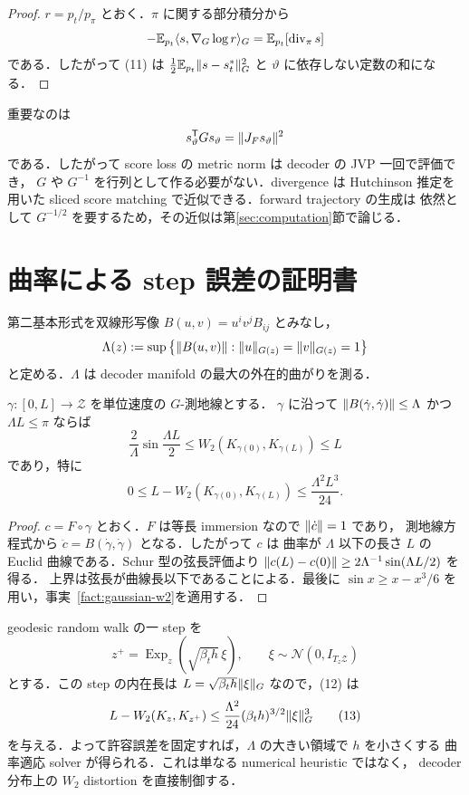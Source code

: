 \documentclass[uplatex,dvipdfmx,11pt,a4paper]{jsarticle}
\begin{document}
\begin{proof}
  $r=p_t/p_\pi$ とおく．$\pi$ に関する部分積分から
  \[
    -\mathbb{E}_{p_t}\langle s,\nabla_G\log r\rangle_G
    =\mathbb{E}_{p_t}[\operatorname{div}_\pi s]
  \]
  である．したがって (11) は
  $\frac12\mathbb{E}_{p_t}\lVert s-s_t^* \rVert_G^2$ と $\vartheta$ に依存しない定数の和になる．
\end{proof}

重要なのは
\[
  s_\vartheta^{\mathsf T}Gs_\vartheta
  =\lVert J_Fs_\vartheta \rVert^2
\]
である．したがって score loss の metric norm は decoder の JVP 一回で評価でき，
$G$ や $G^{-1}$ を行列として作る必要がない．divergence は Hutchinson 推定を用いた
sliced score matching \cite{song2020} で近似できる．forward trajectory の生成は
依然として $G^{-1/2}$ を要するため，その近似は第\ref{sec:computation}節で論じる．

\section{曲率による step 誤差の証明書}
\label{sec:certificate}

第二基本形式を双線形写像
$B(u,v)=u^iv^jB_{ij}$ とみなし，
\[
  \Lambda(z)
  :=\sup\left\{\lVert B(u,v) \rVert:
      \lVert u \rVert_{G(z)}=\lVert v \rVert_{G(z)}=1\right\}
\]
と定める．$\Lambda$ は decoder manifold の最大の外在的曲がりを測る．

\begin{theorem}
\label{thm:chord}
  $\gamma\colon[0,L]\to\mathcal{Z}$ を単位速度の $G$-測地線とする．
  $\gamma$ に沿って
  $\lVert B(\dot\gamma,\dot\gamma) \rVert\leq\Lambda$ かつ $\Lambda L\leq\pi$ ならば
  \[
    \frac{2}{\Lambda}\sin\frac{\Lambda L}{2}
    \leq W_2(K_{\gamma(0)},K_{\gamma(L)})\leq L
  \]
  であり，特に
  \[
    \boxed{
    0\leq L-W_2(K_{\gamma(0)},K_{\gamma(L)})
    \leq\frac{\Lambda^2L^3}{24}.
    }
    \tag{12}
  \]
\end{theorem}

\begin{proof}
  $c=F\circ\gamma$ とおく．$F$ は等長 immersion なので $\lVert \dot c \rVert=1$ であり，
  測地線方程式から $\ddot c=B(\dot\gamma,\dot\gamma)$ となる．したがって $c$ は
  曲率が $\Lambda$ 以下の長さ $L$ の Euclid 曲線である．Schur 型の弦長評価より
  $\lVert c(L)-c(0) \rVert\geq2\Lambda^{-1}\sin(\Lambda L/2)$ を得る．
  上界は弦長が曲線長以下であることによる．最後に
  $\sin x\geq x-x^3/6$ を用い，事実~\ref{fact:gaussian-w2}を適用する．
\end{proof}

geodesic random walk の一 step を
\[
  z^+=\operatorname{Exp}_z(\sqrt{\beta_th}\,\xi),
  \qquad \xi\sim\mathcal{N}(0,I_{T_z\mathcal{Z}})
\]
とする．この step の内在長は
$L=\sqrt{\beta_th}\lVert \xi \rVert_G$ なので，(12) は
\[
  L-W_2(K_z,K_{z^+})
  \leq
  \frac{\Lambda^2}{24}(\beta_th)^{3/2}\lVert \xi \rVert_G^3
  \tag{13}
\]
を与える．よって許容誤差を固定すれば，$\Lambda$ の大きい領域で $h$ を小さくする
曲率適応 solver が得られる．これは単なる numerical heuristic ではなく，
decoder 分布上の $W_2$ distortion を直接制御する．
\end{document}
